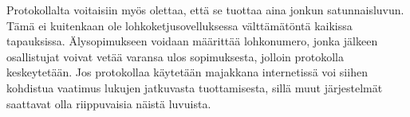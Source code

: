 Protokollalta voitaisiin myös olettaa, että se tuottaa aina jonkun satunnaisluvun. Tämä ei kuitenkaan ole lohkoketjusovelluksessa välttämätöntä kaikissa tapauksissa. Älysopimukseen voidaan määrittää lohkonumero, jonka jälkeen osallistujat voivat vetää varansa ulos sopimuksesta, jolloin protokolla keskeytetään. Jos protokollaa käytetään majakkana internetissä voi siihen kohdistua vaatimus lukujen jatkuvasta tuottamisesta, sillä muut järjestelmät saattavat olla riippuvaisia näistä luvuista.